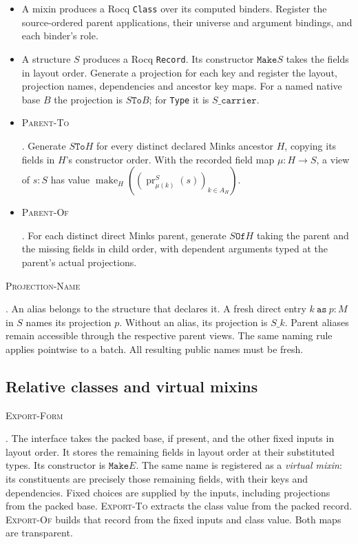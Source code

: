 \documentclass{article}
\newcommand{\ttt}[1]{\texttt{#1}}
\newcommand{\proj}{\operatorname{pr}}
\newcommand{\make}{\operatorname{make}}
\newcommand{\rdefn}[1]{\hypertarget{rule-#1}{\textsc{#1}}}
\begin{document}
\begin{itemize}
\item A mixin produces a Rocq \ttt{Class} over its computed binders. Register
the source-ordered parent applications, their universe and argument
bindings, and each binder's role.
\item A structure $S$ produces a Rocq \ttt{Record}. Its constructor
$\ttt{Make}S$ takes the fields in layout order. Generate a projection
for each key and register the layout, projection names, dependencies
and ancestor key maps. For a named native base $B$ the projection is
$S\ttt{To}B$; for \ttt{Type} it is $S\ttt{\_carrier}$.
\item \rdefn{Parent-To}. Generate $S\mathbin{\ttt{To}}H$ for every distinct
declared Minks ancestor $H$, copying its fields in $H$'s constructor
order. With the recorded field map $\mu:H\to S$, a view of $s:S$ has value
$\make_H((\proj^S_{\mu(k)}(s))_{k\in A_H})$.
\item \rdefn{Parent-Of}. For each distinct direct Minks parent, generate
$S\mathbin{\ttt{Of}}H$ taking the parent and the missing fields in child
order, with dependent arguments typed at the parent's actual projections.
\end{itemize}

\rdefn{Projection-Name}. An alias belongs to the structure that declares
it. A fresh direct entry $k\ \ttt{as}\ p:M$ in $S$ names its projection $p$.
Without an alias, its projection is $S\mathbin{\ttt{\_}}k$.
Parent aliases remain accessible through the respective parent views.
The same naming rule applies pointwise to a batch. All resulting public names must be fresh.

\subsection{Relative classes and virtual mixins}
\label{sec:relative}

\rdefn{Export-Form}. The interface takes the packed base, if present,
and the other fixed inputs in layout order. It stores the remaining
fields in layout order at their substituted types. Its constructor is
$\ttt{Make}E$. The same name is registered as a \emph{virtual mixin}:
its constituents are precisely those remaining fields, with their keys
and dependencies. Fixed choices are supplied by the inputs, including
projections from the packed base.
\rdefn{Export-To} extracts the class value from the packed record.
\rdefn{Export-Of} builds that record from the fixed inputs and class
value. Both maps are transparent.
\end{document}
